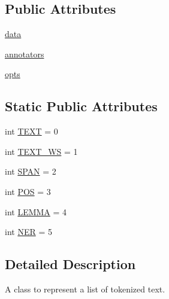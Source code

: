 \subsection*{Public Attributes}
\begin{DoxyCompactItemize}
\item 
\hyperlink{classparlai_1_1agents_1_1tfidf__retriever_1_1tokenizers_1_1tokenizer_1_1Tokens_ad5068b92d72245d43fd75dbb4c070a27}{data}
\item 
\hyperlink{classparlai_1_1agents_1_1tfidf__retriever_1_1tokenizers_1_1tokenizer_1_1Tokens_a394834203475385444a933440dcdd026}{annotators}
\item 
\hyperlink{classparlai_1_1agents_1_1tfidf__retriever_1_1tokenizers_1_1tokenizer_1_1Tokens_ada7339fd7da0200a4260970771f9bfe9}{opts}
\end{DoxyCompactItemize}
\subsection*{Static Public Attributes}
\begin{DoxyCompactItemize}
\item 
int \hyperlink{classparlai_1_1agents_1_1tfidf__retriever_1_1tokenizers_1_1tokenizer_1_1Tokens_a9aa424cb61b8e4fa45019647aa3a469f}{T\+E\+XT} = 0
\item 
int \hyperlink{classparlai_1_1agents_1_1tfidf__retriever_1_1tokenizers_1_1tokenizer_1_1Tokens_ac1965a5c7e633c9824f5de66b5211325}{T\+E\+X\+T\+\_\+\+WS} = 1
\item 
int \hyperlink{classparlai_1_1agents_1_1tfidf__retriever_1_1tokenizers_1_1tokenizer_1_1Tokens_a854cddac2a5c84a5d770aa938f304f09}{S\+P\+AN} = 2
\item 
int \hyperlink{classparlai_1_1agents_1_1tfidf__retriever_1_1tokenizers_1_1tokenizer_1_1Tokens_ac86fd8e346abb9582109d8e11e5f9b48}{P\+OS} = 3
\item 
int \hyperlink{classparlai_1_1agents_1_1tfidf__retriever_1_1tokenizers_1_1tokenizer_1_1Tokens_a0edd5b712de93117c645a869bda3206a}{L\+E\+M\+MA} = 4
\item 
int \hyperlink{classparlai_1_1agents_1_1tfidf__retriever_1_1tokenizers_1_1tokenizer_1_1Tokens_a23de330eaa8a95b1eec932b960384516}{N\+ER} = 5
\end{DoxyCompactItemize}


\subsection{Detailed Description}
\begin{DoxyVerb}A class to represent a list of tokenized text.
\end{DoxyVerb}
 

